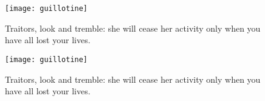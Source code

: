 \documentclass[
a5paper,
BCOR=7mm,
twoside,
DIV=calc,
12pt,
usegeometry,
chapterprefix,
endperiod,
headings=big]{scrbook}
\begin{document}
\frontmatter
\renewcommand*{\sectionmarkformat}{}






\renewcommand*\raggedchapter{\centering}
%


\tableofcontents
\clearpage


\makeatletter
{}
{%
\begin{figure}[p!]
	\centering
	\texttt{[image: guillotine]}
	\caption{Traitors, look and tremble: she will cease her activity only when you have all lost your lives.}
	\label{guillotine}
\end{figure}
\thispagestyle{empty}
\clearpage

}{%
\vfill
\begin{figure}[p!]
	\centering
	\texttt{[image: guillotine]}
	\caption{Traitors, look and tremble: she will cease her activity only when you have all lost your lives.}
	\label{guillotine}
\end{figure}
\vfill
\thispagestyle{empty}
\clearpage
}
\makeatother
\end{document}
